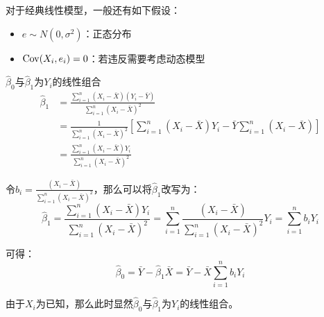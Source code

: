 \documentclass[11pt]{article}
\begin{document}
对于经典线性模型，一般还有如下假设：
\begin{itemize}
    \item $e \sim N(0,\sigma^2)$：正态分布
    \item $\operatorname{Cov}(X_i,e_i) = 0$：若违反需要考虑动态模型
\end{itemize}

\begin{property}
    $\hat{\beta}_0$与$\hat{\beta}_1$为$Y_i$的线性组合
    \begin{align*}
        \hat{\beta}_1 &= \frac{\sum_{i=1}^{n} \left(X_i - \bar{X}\right) \left(Y_i - \bar{Y}\right)}{\sum_{i=1}^{n} \left(X_i - \bar{X}\right)^2} \\
        &= \frac{1}{\sum_{i=1}^{n} \left(X_i - \bar{X}\right)^2} \left[ \sum_{i=1}^{n} \left( X_i - \bar{X} \right) Y_i - \bar{Y} \sum_{i=1}^{n} \left( X_i - \bar{X} \right) \right] \\
        &= \frac{\sum_{i=1}^{n} \left(X_i - \bar{X}\right) Y_i}{\sum_{i=1}^{n} \left(X_i - \bar{X}\right)^2}
    \end{align*}

    令$b_i = \frac{\left(X_i - \bar{X}\right)}{\sum_{i=1}^{n} \left(X_i - \bar{X}\right)^2}$，那么可以将$\hat{\beta}_1$改写为：
    \begin{equation*}
        \hat{\beta}_1
        = \frac{\sum_{i=1}^{n} \left(X_i - \bar{X}\right) Y_i}{\sum_{i=1}^{n} \left(X_i - \bar{X}\right)^2}
        = \sum_{i=1}^{n} \frac{ \left(X_i - \bar{X}\right)}{\sum_{i=1}^{n} \left(X_i - \bar{X}\right)^2} Y_i
        = \sum_{i=1}^{n} b_i Y_i
    \end{equation*}

    可得：
    \begin{equation*}
        \hat{\beta}_0 = \bar{Y} - \hat{\beta}_1 \bar{X}
        = \bar{Y} - \bar{X} \sum_{i=1}^{n} b_i Y_i
    \end{equation*}
    
    由于$X_i$为已知，那么此时显然$\hat{\beta}_0$与$\hat{\beta}_1$为$Y_i$的线性组合。
\end{property}
\end{document}
